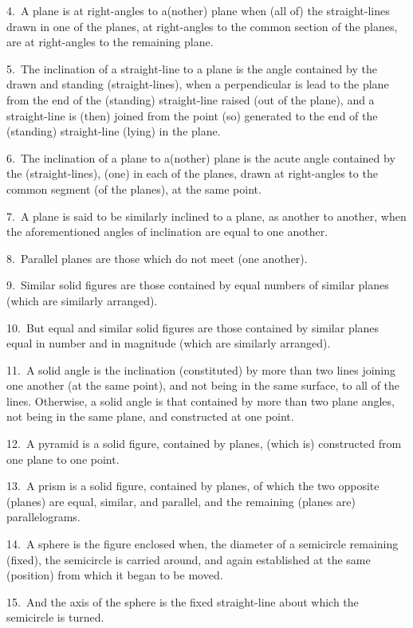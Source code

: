 \begin{Parallel}{}{}
{4.~A plane is at right-angles to a(nother) plane when (all of) the  straight-lines drawn in one of the planes, at right-angles to the common section
of the planes, are at right-angles to the remaining plane.

5.~The inclination of a straight-line to a plane is the angle contained
by the drawn and standing (straight-lines), when a perpendicular is
lead  to the plane from the end of the (standing) straight-line raised (out of the plane), and a straight-line
is (then) joined from the point (so) generated to the end of the (standing) straight-line (lying) in the plane.

6.~The inclination of a plane to a(nother) plane is the  acute angle
contained by the (straight-lines), (one)  in each of the planes, drawn at right-angles to the common segment
(of the planes), at the same point.

7.~A plane is said to be similarly inclined to a plane,
as another  to  another, when the aforementioned angles
of inclination are equal to one another.

8.~Parallel planes are those which do not meet (one another).

9.~Similar solid figures are those contained by equal numbers of similar
planes (which are similarly arranged).

10.~But equal and similar solid figures are those contained
by similar planes equal in number and in magnitude (which are similarly arranged).

11.~A solid angle is the inclination (constituted) by more than two lines joining one another (at the same point), and
not being in the same surface, to all of the lines. Otherwise,
a solid angle is that contained by more than two plane angles, not being
in the same plane, and constructed at one point.

12.~A pyramid is a solid figure, contained by planes, (which is) constructed from one plane to
one  point.

13.~A prism is a solid figure, contained by planes, of which the two opposite
(planes)
are equal, similar, and parallel, and the remaining (planes are) parallelograms.

14.~A sphere is the figure enclosed when, the diameter of a semicircle remaining (fixed), the semicircle is carried around,
 and  again established at the same (position) from which it began to be moved.
 
15.~And the axis of the sphere is the fixed straight-line about
 which the semicircle is turned.
 
}
\end{Parallel}
